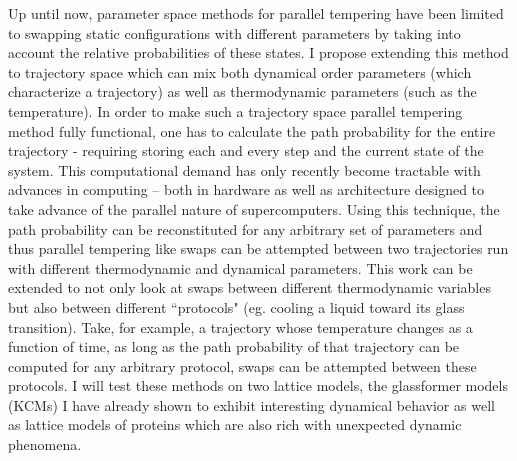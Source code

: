 \documentclass[11pt]{article}
\newcommand{\kB}{k_{\mathrm{B}}}
\begin{document}
Up until now, parameter space methods for parallel tempering %
have been limited to swapping static configurations with different parameters by taking into account the relative probabilities of these states.  I propose extending this method to trajectory space which can mix both dynamical order parameters (which characterize a trajectory) as well as thermodynamic parameters (such as the temperature).  In order to make such a trajectory space parallel tempering method fully functional, one has to calculate the path probability for the entire trajectory - requiring storing each and every step and the current state of the system.  This computational demand has only recently become tractable with advances in computing -- both in hardware as well as architecture designed to take advance of the parallel nature of supercomputers.   Using this technique, the path probability can be reconstituted for any arbitrary set of parameters and thus parallel tempering like swaps can be attempted between two trajectories run with different thermodynamic and dynamical parameters.  This work can be extended to not only look at swaps between different thermodynamic variables but also between different ``protocols" (eg. cooling a liquid toward its glass transition). Take, for example, a trajectory whose temperature changes as a function of time, as long as the path probability of that trajectory can be computed for any arbitrary protocol, swaps can be attempted between these protocols.  I will test these methods on two lattice models, the glassformer models (KCMs) I have already shown to exhibit interesting dynamical behavior as well as lattice models of proteins which are also rich with unexpected dynamic phenomena.  

\end{document}
